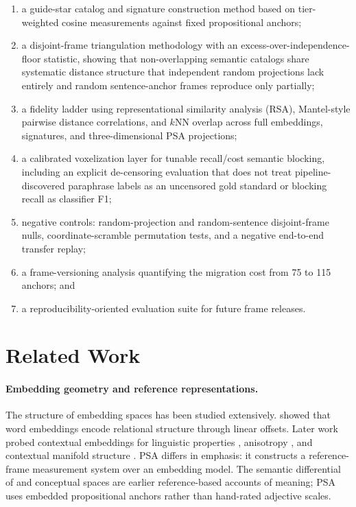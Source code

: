\documentclass[11pt]{article}
\begin{document}
\begin{enumerate}
    \item a guide-star catalog and signature construction method based on tier-weighted cosine measurements against fixed propositional anchors;
    \item a disjoint-frame triangulation methodology with an excess-over-independence-floor statistic, showing that non-overlapping semantic catalogs share systematic distance structure that independent random projections lack entirely and random sentence-anchor frames reproduce only partially;
    \item a fidelity ladder using representational similarity analysis (RSA), Mantel-style pairwise distance correlations, and $k$NN overlap across full embeddings, signatures, and three-dimensional PSA projections;
    \item a calibrated voxelization layer for tunable recall/cost semantic blocking, including an explicit de-censoring evaluation that does not treat pipeline-discovered paraphrase labels as an uncensored gold standard or blocking recall as classifier F1;
    \item negative controls: random-projection and random-sentence disjoint-frame nulls, coordinate-scramble permutation tests, and a negative end-to-end transfer replay;
    \item a frame-versioning analysis quantifying the migration cost from 75 to 115 anchors; and
    \item a reproducibility-oriented evaluation suite for future frame releases.
\end{enumerate}

\section{Related Work}

\paragraph{Embedding geometry and reference representations.}
The structure of embedding spaces has been studied extensively. \citet{mikolov2013distributed} showed that word embeddings encode relational structure through linear offsets. Later work probed contextual embeddings for linguistic properties \citep{hewitt2019structural}, anisotropy \citep{ethayarajh2019contextual}, and contextual manifold structure \citep{cai2021isotropy}. PSA differs in emphasis: it constructs a reference-frame measurement system over an embedding model. The semantic differential of \citet{osgood1957measurement} and conceptual spaces \citep{gardenfors2000conceptual} are earlier reference-based accounts of meaning; PSA uses embedded propositional anchors rather than hand-rated adjective scales.
\end{document}
